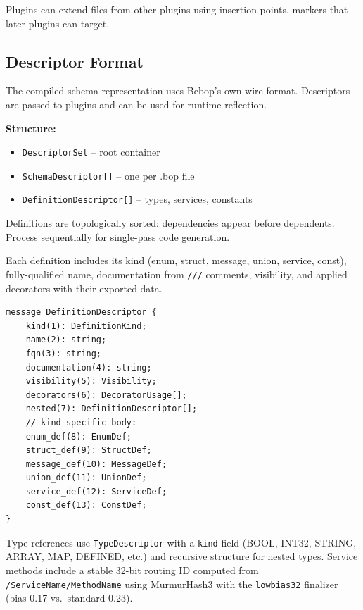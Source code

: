 \documentclass[10pt,onecolumn]{article}
\begin{document}
Plugins can extend files from other plugins using insertion points, markers that later plugins can target.

\subsection{Descriptor Format}

The compiled schema representation uses Bebop's own wire format. Descriptors are passed to plugins and can be used for runtime reflection.

\begin{minipage}{\textwidth}
\begin{minipage}[t]{0.52\textwidth}
\raggedright
\textbf{Structure:}
\begin{itemize}[leftmargin=1.2em,itemsep=1pt,topsep=2pt]
\item \texttt{DescriptorSet} -- root container
\item \texttt{SchemaDescriptor[]} -- one per .bop file
\item \texttt{DefinitionDescriptor[]} -- types, services, constants
\end{itemize}

Definitions are topologically sorted: dependencies appear before dependents. Process sequentially for single-pass code generation.

Each definition includes its kind (enum, struct, message, union, service, const), fully-qualified name, documentation from \texttt{///} comments, visibility, and applied decorators with their exported data.
\end{minipage}\hfill
\begin{minipage}[t]{0.44\textwidth}
\begin{lstlisting}[language=bebop,aboveskip=0pt,belowskip=0pt]
message DefinitionDescriptor {
    kind(1): DefinitionKind;
    name(2): string;
    fqn(3): string;
    documentation(4): string;
    visibility(5): Visibility;
    decorators(6): DecoratorUsage[];
    nested(7): DefinitionDescriptor[];
    // kind-specific body:
    enum_def(8): EnumDef;
    struct_def(9): StructDef;
    message_def(10): MessageDef;
    union_def(11): UnionDef;
    service_def(12): ServiceDef;
    const_def(13): ConstDef;
}
\end{lstlisting}
\end{minipage}
\end{minipage}

Type references use \texttt{TypeDescriptor} with a \texttt{kind} field (BOOL, INT32, STRING, ARRAY, MAP, DEFINED, etc.) and recursive structure for nested types. Service methods include a stable 32-bit routing ID computed from \texttt{/ServiceName/MethodName} using MurmurHash3 with the \texttt{lowbias32} finalizer~\cite{hashprospector} (bias 0.17 vs.\ standard 0.23).
\end{document}

